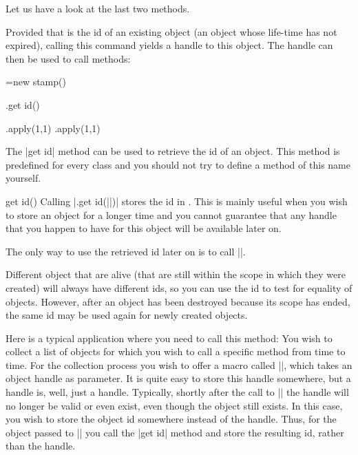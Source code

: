 Let us have a look at the last two methods.

\begin{command}{\pgfooobj{}}
  Provided that  is the id of an existing object (an object
  whose life-time has not expired), calling this command yields a
  handle to this object. The handle can then be used to call methods:
\begin{codeexample}
\pgfoonew \mystamp=new stamp()

\mystamp.get id(\myid)

\mystamp.apply(1,1)
\pgfooobj{\myid}.apply(1,1)
\end{codeexample}
\end{command}

The |get id| method can be used to retrieve the id of an object. This
method is predefined for every class and you should not try to define
a method of this name yourself.

\begin{predefinedmethod}{get id()}
  Calling |.get id(||)|  stores the id  in
  . This is mainly useful when you wish to store an
  object for a longer time and you cannot guarantee that any handle
  that you happen to have for this object will be available later on.

  The only way to use the retrieved id later on is to call
  |\pgfooobj|.

  Different object that are alive (that are still within the scope in
  which they were created) will always have different ids, so you can
  use the id to test for equality of objects. However, after an object
  has been destroyed because its scope has ended, the same id may be
  used again for newly created objects.

  Here is a typical application where you need to call this method:
  You wish to collect a list of objects for which you wish to call a
  specific method from time to time. For the collection process you
  wish to offer a macro called |\addtoobjectlist|, which takes an
  object handle as parameter. It is quite easy to store this handle
  somewhere, but a handle is, well, just a handle. Typically, shortly
  after the call to |\addtoobjectlist| the handle will no longer be
  valid or even exist, even though the object still exists. In this
  case, you wish to store the object id somewhere instead of the
  handle. Thus, for the object passed to |\addtoobjectlist| you call
  the |get id| method and store the resulting id, rather than the handle.
\end{predefinedmethod}

